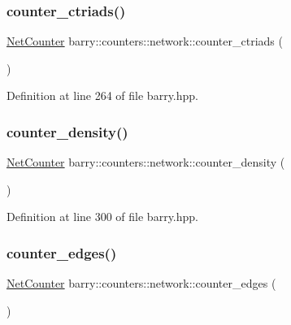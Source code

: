 \subsubsection{\texorpdfstring{counter\+\_\+ctriads()}{counter\_ctriads()}}
{\footnotesize\ttfamily \hyperlink{namespacebarry_1_1counters_1_1network_a067bd9de04608fc2e1586324d3864a45}{Net\+Counter} barry\+::counters\+::network\+::counter\+\_\+ctriads (\begin{DoxyParamCaption}{ }\end{DoxyParamCaption})\hspace{0.3cm}{\ttfamily [inline]}}



Definition at line 264 of file barry.\+hpp.

\mbox{\label{namespacebarry_1_1counters_1_1network_a9cbf0a070797cf3e142a06f7a2a87da1}} 
\subsubsection{\texorpdfstring{counter\+\_\+density()}{counter\_density()}}
{\footnotesize\ttfamily \hyperlink{namespacebarry_1_1counters_1_1network_a067bd9de04608fc2e1586324d3864a45}{Net\+Counter} barry\+::counters\+::network\+::counter\+\_\+density (\begin{DoxyParamCaption}{ }\end{DoxyParamCaption})\hspace{0.3cm}{\ttfamily [inline]}}



Definition at line 300 of file barry.\+hpp.

\mbox{\label{namespacebarry_1_1counters_1_1network_a0c35780c6c0d2a87c6b78304fc1c3664}} 
\subsubsection{\texorpdfstring{counter\+\_\+edges()}{counter\_edges()}}
{\footnotesize\ttfamily \hyperlink{namespacebarry_1_1counters_1_1network_a067bd9de04608fc2e1586324d3864a45}{Net\+Counter} barry\+::counters\+::network\+::counter\+\_\+edges (\begin{DoxyParamCaption}{ }\end{DoxyParamCaption})\hspace{0.3cm}{\ttfamily [inline]}}



